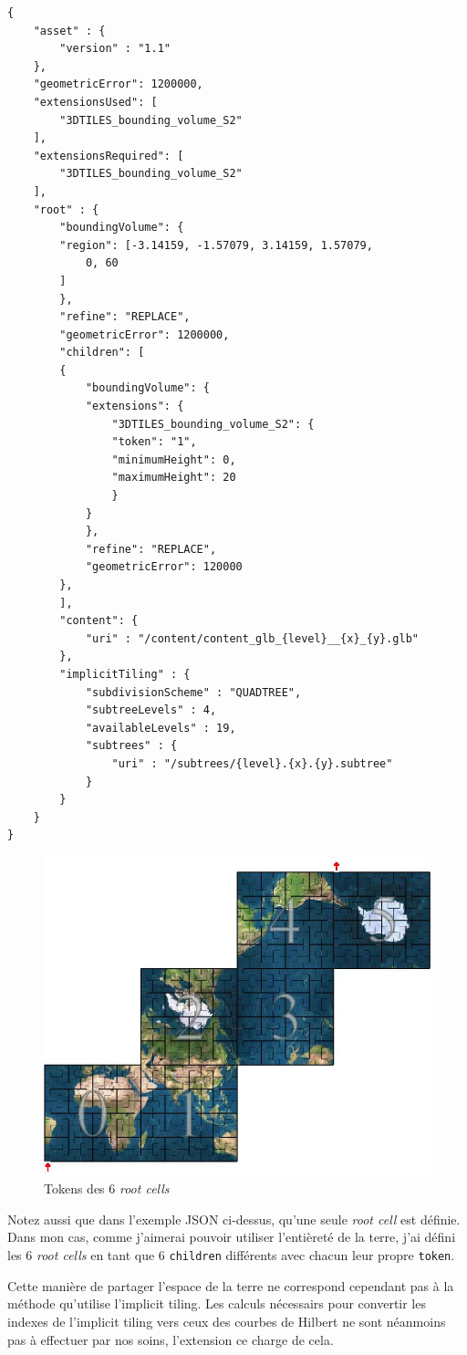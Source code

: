 \begin{verbatim}
{
    "asset" : {
        "version" : "1.1"
    },
    "geometricError": 1200000,
    "extensionsUsed": [
        "3DTILES_bounding_volume_S2"
    ],
    "extensionsRequired": [
        "3DTILES_bounding_volume_S2"
    ],
    "root" : {
        "boundingVolume": {
        "region": [-3.14159, -1.57079, 3.14159, 1.57079,
            0, 60
        ]
        },
        "refine": "REPLACE",
        "geometricError": 1200000,
        "children": [
        {
            "boundingVolume": {
            "extensions": {
                "3DTILES_bounding_volume_S2": {
                "token": "1",
                "minimumHeight": 0,
                "maximumHeight": 20
                }
            }
            },
            "refine": "REPLACE",
            "geometricError": 120000
        },
        ],
        "content": {
            "uri" : "/content/content_glb_{level}__{x}_{y}.glb"
        },
        "implicitTiling" : {
            "subdivisionScheme" : "QUADTREE",
            "subtreeLevels" : 4,
            "availableLevels" : 19,
            "subtrees" : {
                "uri" : "/subtrees/{level}.{x}.{y}.subtree"
            }
        }
    }
}
\end{verbatim}

\begin{figure}[H]
    \centering
    \includegraphics[width=1\textwidth]{assets/figures/s2cell_global.jpg}
    \caption{Tokens des 6 \textit{root cells} \cite{3DTILES_bounding_volume_S2-website}}
    \label{fig:s2-ext}
\end{figure}

Notez aussi que dans l'exemple JSON ci-dessus, qu'une seule \textit{root cell} est définie. Dans mon cas, comme j'aimerai pouvoir utiliser l'entièreté de la terre, j'ai défini les 6 \textit{root cells} en tant que 6 \texttt{children} différents avec chacun leur propre \texttt{token}.

Cette manière de partager l'espace de la terre ne correspond cependant pas à la méthode qu'utilise l'implicit tiling. Les calculs nécessairs pour convertir les indexes de l'implicit tiling vers ceux des courbes de Hilbert ne sont néanmoins pas à effectuer par nos soins, l'extension ce charge de cela.